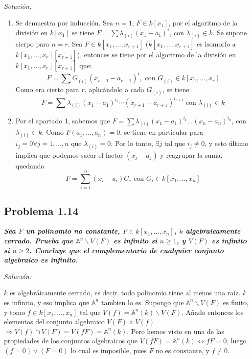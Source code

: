 \textit{Solución:}
\vspace{2mm}

\begin{enumerate}
\item Se demuestra por inducción. Sea $n=1$, $F\in k[x_1]$, por el algoritmo de la división en $k[x_1]$ se tiene $F=\sum \lambda_{(i)}(x_1-a_1)^i$, con $\lambda_{(i)}\in k$. Se supone cierpo para $n=r$. Sea $F\in k[x_1,\dots,x_{r+1}]$ ($k[x_1,\dots,x_{r+1}]$ es isomorfo a $k[x_1,\dots,x_r][x_{r+1}]$), entonces se tiene por el algoritmo de la división en  $k[x_1,\dots,x_r][x_{r+1}]$ que:
  $$F=\sum G_{(i)}(x_{r+1}-a_{r+1})^{i},\text{ con } G_{(i)}\in k[x_1,\dots,x_r]$$
  Como era cierto para $r$, aplicándolo a cada $G_{(i)}$, se tiene:
  $$F=\sum \lambda_{(i)}(x_1-a_1)^{i_1}\cdots(x_{r+1}-a_{r+1})^{i_{r+1}} \text{ con } \lambda_{(i)}\in k$$
\item Por el apartado 1, sabemos que $F= \sum \lambda_{(i)}(x_1-a_1)^{i_1}\dots(x_n-a_n)^{i_n}$, con $\lambda_{(i)} \in k$. Como $F(a_1,\dots, a_n)=0$, se tiene en particular para $i_j=0 \forall j = 1,\dots ,n$ que $\lambda_{(i)}=0$. Por lo tanto, $\exists j$ tal que $i_j\neq 0$, y esto último implica que podemos sacar el factor $(x_j-a_j)$ y reagrupar la suma, quedando
$$F=\sum_{i=1}^n(x_i-a_i)G_i \text{ con } G_i \in k[x_1,\dots ,x_n] $$
\end{enumerate}

\subsection{Problema 1.14}

\textbf{\textit{Sea $F$ un polinomio no constante, $F\in k[x_1,\dots ,x_n]$, $k$ algebraicamente cerrado. Prueba que $\mathbb{A}^n \backslash V(F)$ es infinito si
  $n \ge 1$, y $V(F)$ es infinito si $n\ge 2$. Concluye que el complementario de cualquier conjunto algebraico es infinito.}}

\textit{Solución: }

\vspace{2mm}
$k$ es algebráicamente cerrado, es decir, todo polinomio tiene al menos una raíz. $k$ es infinito, y eso implica que $\mathbb{A}^n$ tambien lo es. Supongo que $\mathbb{A}^n \backslash V(F)$ es finito, y tomo $ f \in k[x_1,\dots , x_n]$ tal que $V(f)=\mathbb{A}^n(k) \backslash V(F)$. Añado entonces los elementos del conjunto algebraico $V(F)$ a $V(f)$ $\Rightarrow V(f)\cap V(F) = V(fF) = \mathbb{A}^n(k)$. Pero hemos visto en una de las propiedades de los conjuntos algebraicos que $V(fF)= \mathbb{A}^n(k) \Leftrightarrow fF=0$, luego $(f=0)\vee (F=0)$ lo cual es imposible, pues $F$ no es constante, y $f\neq 0$.
\vspace{1mm}


